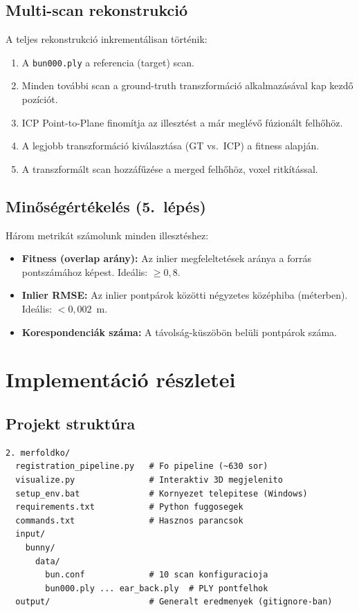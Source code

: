 \documentclass[12pt,a4paper]{article}
\begin{document}
\subsection{Multi-scan rekonstrukció}

A teljes rekonstrukció inkrementálisan történik:
\begin{enumerate}[nosep]
    \item A \texttt{bun000.ply} a referencia (target) scan.
    \item Minden további scan a ground-truth transzformáció alkalmazásával kap kezdő pozíciót.
    \item ICP Point-to-Plane finomítja az illesztést a már meglévő fúzionált felhőhöz.
    \item A legjobb transzformáció kiválasztása (GT vs.\ ICP) a fitness alapján.
    \item A transzformált scan hozzáfűzése a merged felhőhöz, voxel ritkítással.
\end{enumerate}

\subsection{Minőségértékelés (5.~lépés)}

Három metrikát számolunk minden illesztéshez:

\begin{itemize}[nosep]
    \item \textbf{Fitness (overlap arány):} Az inlier megfeleltetések aránya a forrás pontszámához képest. Ideális: $\geq 0{,}8$.
    \item \textbf{Inlier RMSE:} Az inlier pontpárok közötti négyzetes középhiba (méterben). Ideális: $< 0{,}002$~m.
    \item \textbf{Korespondenciák száma:} A távolság-küszöbön belüli pontpárok száma.
\end{itemize}

\section{Implementáció részletei}

\subsection{Projekt struktúra}

\begin{lstlisting}[language={}]
2. merfoldko/
  registration_pipeline.py   # Fo pipeline (~630 sor)
  visualize.py               # Interaktiv 3D megjelenito
  setup_env.bat              # Kornyezet telepitese (Windows)
  requirements.txt           # Python fuggosegek
  commands.txt               # Hasznos parancsok
  input/
    bunny/
      data/
        bun.conf             # 10 scan konfiguracioja
        bun000.ply ... ear_back.ply  # PLY pontfelhok
  output/                    # Generalt eredmenyek (gitignore-ban)
\end{lstlisting}
\end{document}
